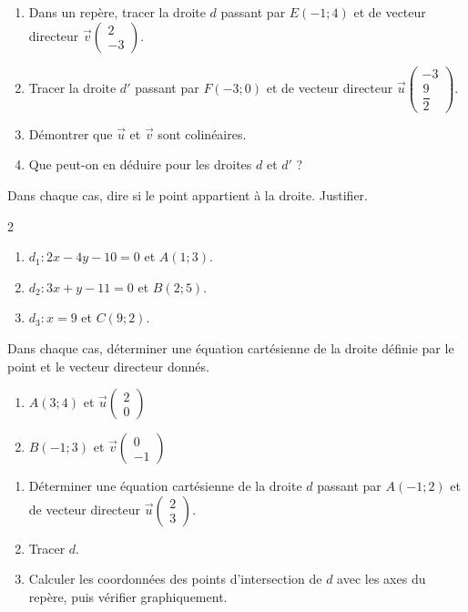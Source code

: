 \exo
\begin{enumerate}
\item Dans un repère, tracer la droite $d$ passant par $E(-1;4)$ et de vecteur directeur $\overrightarrow{v} \left( \begin{array}{c}
2\\
-3
\end{array} \right)$.
\item Tracer la droite $d'$ passant par $F(-3;0)$ et de vecteur directeur $\overrightarrow{u} \left( \begin{array}{c}
-3\\
\dfrac{9}{2}
\end{array} \right)$.
\item Démontrer que $\overrightarrow{u}$ et $\overrightarrow{v}$ sont colinéaires.
\item Que peut-on en déduire pour les droites $d$ et $d'$ ?
\end{enumerate}

\exo
Dans chaque cas, dire si le point appartient à la droite. Justifier.
\setlength{\columnseprule}{0pt}
\begin{multicols}{2}
\begin{enumerate}
\item $d_1: 2x-4y-10=0$ et $A(1;3)$.
\item $d_2: 3x+y -11 =0$ et $B(2;5)$.
\item $d_3: x=9$ et $C(9;2)$.
\end{enumerate}
\end{multicols}

\exo
Dans chaque cas, déterminer une équation cartésienne de la droite définie par le point et le vecteur directeur donnés.

\begin{enumerate}
\item $A(3;4)$ et  $\overrightarrow{u} \left( \begin{array}{c}
2\\
0
\end{array} \right)$

\item $B(-1;3)$ et  $\overrightarrow{v} \left( \begin{array}{c}
0\\
-1
\end{array} \right)$
\end{enumerate}

\exo
\begin{enumerate}
\item Déterminer une équation cartésienne de la droite $d$ passant par $A(-1;2)$ et de vecteur directeur $\overrightarrow{u} \left( \begin{array}{c}
2\\
3
\end{array} \right)$.
\item Tracer $d$.
\item Calculer les coordonnées des points d'intersection de $d$ avec les axes du repère, puis vérifier graphiquement.
\end{enumerate}


